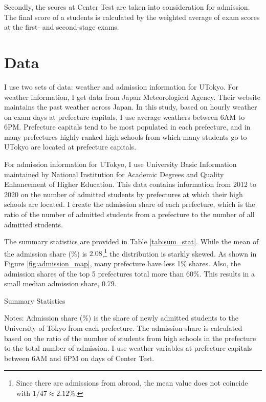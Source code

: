 \documentclass[12pt,letterpaper]{article}
\begin{document}
Secondly, the scores at Center Test are taken into consideration for admission.
The final score of a students is calculated by the weighted average of exam scores at the first- and second-stage exams.

\section{Data}

I use two sets of data: weather and admission information for UTokyo.
For weather information, I get data from Japan Meteorological Agency.
Their website maintains the past weather across Japan.
In this study, based on hourly weather on exam days at prefecture capitals, I use average weathers between 6AM to 6PM.
Prefecture capitals tend to be most populated in each prefecture, and in many prefectures highly-ranked high schools from which many students go to UTokyo are located at prefecture capitals.

For admission information for UTokyo, I use University Basic Information maintained by National Institution for Academic Degrees and Quality Enhancement of Higher Education.
This data contains information from 2012 to 2020 on the number of admitted students by prefectures at which their high schools are located.
I create the admission share of each prefecture, which is the ratio of the number of admitted students from a prefecture to the number of all admitted students.

The summary statistics are provided in Table \ref{tab:sum_stat}.
While the mean of the admission share (\%) is $2.08$,\footnote{
  Since there are admissions from abroad, the mean value does not coincide with $1 / 47 \approx 2.12\%$.
} the distribution is starkly skewed.
As shown in Figure \ref{fig:admission_map}, many prefecture have less 1\% shares.
Also, the admission shares of the top 5 prefectures total more than 60\%.
This results in a small median admission share, $0.79$.

\begin{table}[H]
  \centering
  \caption{Summary Statistics}
  \resizebox{\linewidth}{!}{
  
  }
  \label{tab:sum_stat}
  \footnotesize
  \begin{tablenotes}
    \item 
      Notes:
      Admission share (\%) is the share of newly admitted students to the University of Tokyo from each prefecture.
      The admission share is calculated based on the ratio of the number of students from high schools in the prefecture to the total number of admission.
      I use weather variables at prefecture capitals between 6AM and 6PM on days of Center Test.
  \end{tablenotes}
\end{table}
\end{document}
